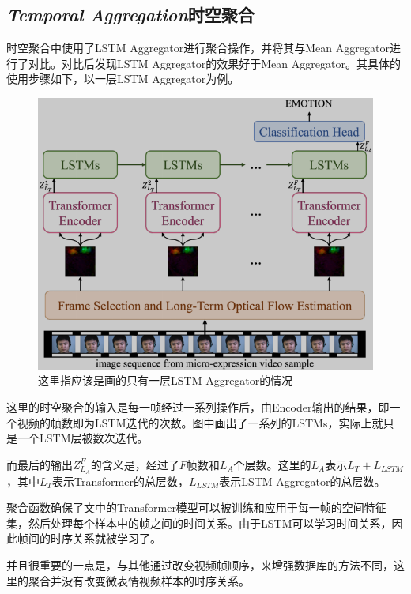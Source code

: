 \documentclass[AutoFakeBold]{MyFormat}
\begin{document}
\subsection{\textit{Temporal Aggregation}时空聚合}
\par 时空聚合中使用了LSTM Aggregator进行聚合操作，并将其与Mean Aggregator进行了对比。对比后发现LSTM Aggregator的效果好于Mean Aggregator。其具体的使用步骤如下，以一层LSTM Aggregator为例。
\begin{figure}[!h]
    \centering
    \includegraphics[width=0.6\linewidth]{figures/2022.07.31/SLSTT model.png}
    \caption{这里指应该是画的只有一层LSTM Aggregator的情况}
\end{figure}
\par 这里的时空聚合的输入是每一帧经过一系列操作后，由Encoder输出的结果，即一个视频的帧数即为LSTM迭代的次数。图中画出了一系列的LSTMs，实际上就只是一个LSTM层被数次迭代。
\par 而最后的输出$Z^F_{L_A}$的含义是，经过了$F$帧数和$L_A$个层数。这里的$L_A$表示$L_T + L_{LSTM}$，其中$L_T$表示Transformer的总层数，$L_{LSTM}$表示LSTM Aggregator的总层数。
\par 聚合函数确保了文中的Transformer模型可以被训练和应用于每一帧的空间特征集，然后处理每个样本中的帧之间的时间关系。由于LSTM可以学习时间关系，因此帧间的时序关系就被学习了。
\par 并且很重要的一点是，与其他通过改变视频帧顺序，来增强数据库的方法不同，这里的聚合并没有改变微表情视频样本的时序关系。







\end{document}
